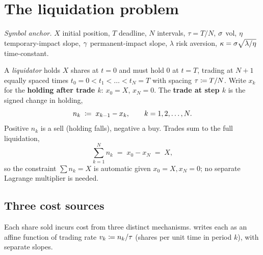 \section{The liquidation problem}
\label{sec:ac_setup}

\emph{Symbol anchor.} $X$ initial position, $T$ deadline, $N$
intervals, $\tau = T/N$, $\sigma$ vol, $\eta$ temporary-impact
slope, $\gamma$ permanent-impact slope, $\lambda$ risk aversion,
$\kappa = \sigma\sqrt{\lambda/\eta}$ time-constant.

A \emph{liquidator} holds $X$ shares at $t = 0$ and must hold $0$
at $t = T$, trading at $N+1$ equally spaced times $t_0 = 0 < t_1 <
\ldots < t_N = T$ with spacing $\tau \coloneqq T/N$. Write $x_k$ for
the \textbf{holding after trade $k$}: $x_0 = X$, $x_N = 0$. The
\textbf{trade at step $k$} is the signed change in holding,
\begin{equation}
  n_k \;\coloneqq\; x_{k-1} - x_k, \qquad k = 1, 2, \ldots, N.
  \label{eq:ac_nk_def}
\end{equation}
Positive $n_k$ is a sell (holding falls), negative a buy. Trades
sum to the full liquidation,
\begin{equation}
  \sum_{k=1}^{N} n_k \;=\; x_0 - x_N \;=\; X,
  \label{eq:ac_ntotal}
\end{equation}
so the constraint $\sum n_k = X$ is automatic given
$x_0 = X, x_N = 0$; no separate Lagrange multiplier is needed.

\subsection{Three cost sources}
\label{subsec:ac_costs}

Each share sold incurs cost from three distinct mechanisms.
\citeAC{} writes each as an affine function of trading rate $v_k
\coloneqq n_k/\tau$ (shares per unit time in period $k$), with
separate slopes.

